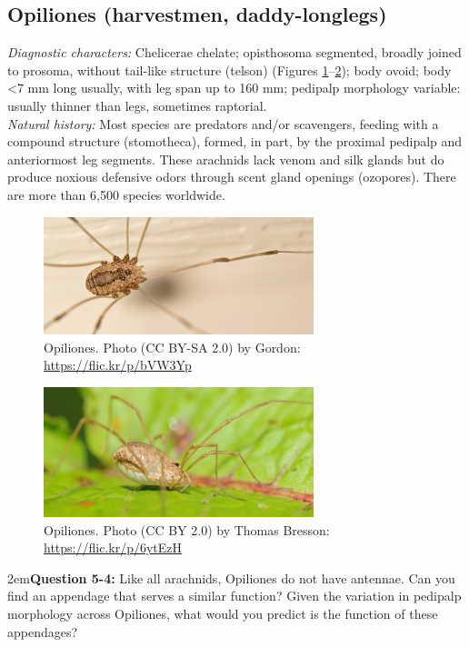 \documentclass[letterpaper, 11pt]{article}
\begin{document}
\subsection{Opiliones (harvestmen, daddy-longlegs)}
\noindent{}\textit{Diagnostic characters:} Chelicerae chelate; opisthosoma segmented, broadly joined to prosoma, without tail-like structure (telson) (Figures \ref{fig:opiliones1}--\ref{fig:opiliones2}); body ovoid; body  \textless7 mm long usually, with leg span up to 160 mm; pedipalp morphology variable: usually thinner than legs, sometimes raptorial.\\

\noindent{}\textit{Natural history:} Most species are predators and/or scavengers, feeding with a compound structure (stomotheca), formed, in part, by the proximal pedipalp and anteriormost leg segments. These arachnids lack venom and silk glands but do produce noxious defensive odors through scent gland openings (ozopores). There are more than 6,500 species worldwide. \\

\begin{figure}[ht!]
  \centering
    \includegraphics[width=0.7\textwidth]{opiliones1}
  \caption{Opiliones. Photo (CC BY-SA 2.0) by Gordon: \url{https://flic.kr/p/bVW3Yp}}
  \label{fig:opiliones1}
\end{figure}

\begin{figure}[ht!]
  \centering
    \includegraphics[width=0.7\textwidth]{opiliones2}
  \caption{Opiliones. Photo (CC BY 2.0) by Thomas Bresson: \url{https://flic.kr/p/6ytEzH}}
  \label{fig:opiliones2}
\end{figure}
\hangindent2em\textbf{Question 5-4:} Like all arachnids, Opiliones do not have antennae. Can you find an appendage that serves a similar function? Given the variation in pedipalp morphology across Opiliones, what would you predict is the function of these appendages?
\end{document}
